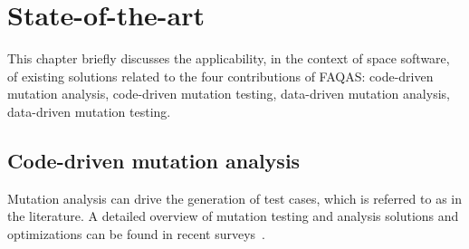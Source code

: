 \chapter{State-of-the-art}
\label{ch:stateOfTheArt}


This chapter briefly discusses the applicability, in the context of space software, of existing solutions related to the four contributions of FAQAS: code-driven mutation analysis,
code-driven mutation testing, data-driven mutation analysis,
data-driven mutation testing.

\section{Code-driven mutation analysis}

Mutation analysis can drive the generation of test cases, which is referred to as  in the literature.
A detailed overview of mutation testing and analysis solutions and optimizations can be found in recent surveys~\cite{jia2010analysis,papadakis2019mutation}.


